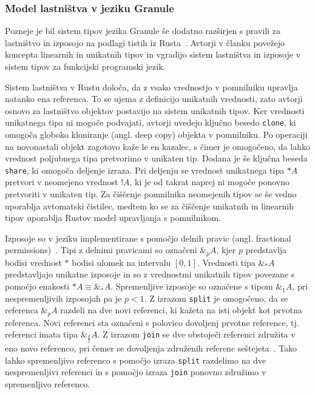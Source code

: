 \subsubsection{Model lastništva v jeziku Granule}

Pozneje je bil sistem tipov jezika Granule še dodatno razširjen s pravili za lastništvo in izposojo na podlagi tistih iz Rusta~\cite{marshall2024functional}. Avtorji v članku povežejo koncepta linearnih in unikatnih tipov in vgradijo sistem lastništva in izposoje v sistem tipov za funkcijski programski jezik.

Sistem lastništva v Rustu določa, da z vsako vrednostjo v pomnilniku upravlja natanko ena referenca. To se ujema z definicijo unikatnih vrednosti, zato avtorji osnovo za lastništvo objektov postavijo na sistem unikatnih tipov. Ker vrednosti unikatnega tipa ni mogoče podvajati, avtorji uvedejo ključno besedo \texttt{clone}, ki omogoča globoko kloniranje (angl. deep copy) objekta v pomnilniku. Po operaciji na novonastali objekt zagotovo kaže le en kazalec, s čimer je omogočeno, da lahko vrednost poljubnega tipa pretvorimo v unikaten tip. Dodana je še ključna beseda \texttt{share}, ki omogoča deljenje izraza. Pri deljenju se vrednost unikatnega tipa $*A$ pretvori v neomejeno vrednost $!A$, ki je od takrat naprej ni mogoče ponovno pretvoriti v unikaten tip. Za čiščenje pomnilnika neomejenih tipov se še vedno uporablja avtomatski čistilec, medtem ko se za čiščenje unikatnih in linearnih tipov uporablja Rustov model upravljanja s pomnilnikom.

Izposoje so v jeziku implementirane s pomočjo delnih pravic (angl. fractional permissions)~\cite{boyland2003checking}. Tipi z delnimi pravicami so označeni $\&_p A$, kjer $p$ predstavlja bodisi vrednost $*$ bodisi ulomek na intervalu $[0, 1]$. Vrednosti tipa $\&_{*} A$ predstavljajo unikatne izposoje in so z vrednostmi unikatnih tipov povezane s pomočjo enakosti $*A \equiv \&_{*} A$. Spremenljive izposoje so označene s tipom $\&_1 A$, pri nespremenljivih izposojah pa je $p < 1$. Z izrazom \texttt{split} je omogočeno, da se referenca $\&_p A$ razdeli na dve novi referenci, ki kažeta na isti objekt kot prvotna referenca. Novi referenci sta označeni s polovico dovoljenj prvotne reference, tj. referenci imata tipa $\&_{\frac{p}{2}} A$. Z izrazom \texttt{join} se dve obstoječi referenci združita v eno novo referenco, pri čemer se dovoljenja združenih referenc seštejeta~\cite{marshall2024functional}. Tako lahko spremenljivo referenco s pomočjo izraza \texttt{split} razdelimo na dve nespremenljivi referenci in s pomočjo izraza \texttt{join} ponovno združimo v spremenljivo referenco.